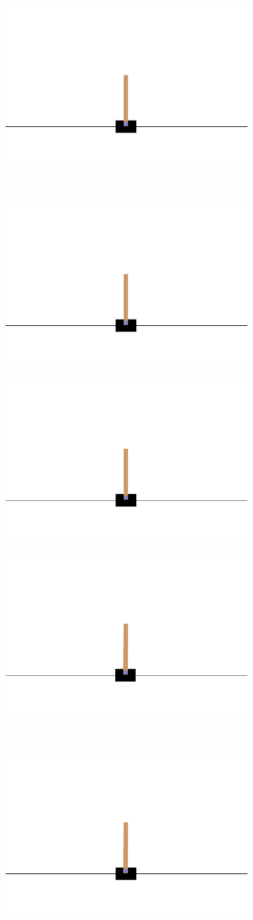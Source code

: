 \begin{figure}[H]
	\hfill
	\begin{subfigure}
		\centering
		\includegraphics[width=0.3\linewidth]{Images/frames/GA/6.png}
	\end{subfigure}
	\\
	\begin{subfigure}
		\centering
		\includegraphics[width=0.3\linewidth]{Images/frames/GA/7.png}
	\end{subfigure}
	\hfill
	\begin{subfigure}
		\centering
		\includegraphics[width=0.3\linewidth]{Images/frames/GA/8.png}
	\end{subfigure}
	\hfill
	\begin{subfigure}
		\centering
		\includegraphics[width=0.3\linewidth]{Images/frames/GA/9.png}
	\end{subfigure}
	\\
	\begin{subfigure}
		\centering
		\includegraphics[width=0.3\linewidth]{Images/frames/GA/10.png}
	\end{subfigure}

\end{figure}
